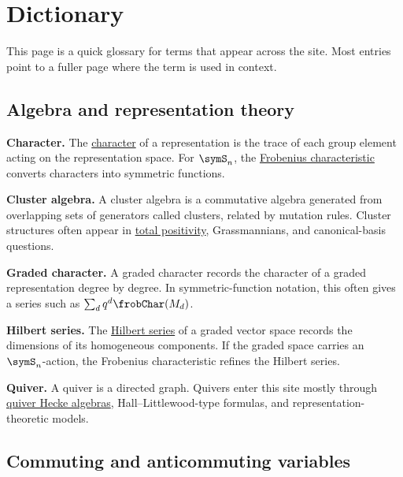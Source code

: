 

\section[wordList]{Dictionary}

This page is a quick glossary for terms that appear across the site.  Most
entries point to a fuller page where the term is used in context.


\subsection[dictionaryAlgebraRepresentation]{Algebra and representation theory}

\textbf{Character.}
The \hyperref[representationCharacterDefinition]{character} of a
representation is the trace of each group element acting on the representation
space.  For $\symS_n$, the
\hyperref[frobeniusCharacteristic]{Frobenius characteristic} converts
characters into symmetric functions.

\textbf{Cluster algebra.}
A cluster algebra is a commutative algebra generated from overlapping sets of
generators called clusters, related by mutation rules.  Cluster structures
often appear in \hyperref[totalPositivity]{total positivity}, Grassmannians,
and canonical-basis questions.

\textbf{Graded character.}
A graded character records the character of a graded representation degree by
degree.  In symmetric-function notation, this often gives a series such as
\(\sum_d q^d\frobChar(M_d)\).

\textbf{Hilbert series.}
The \hyperref[hilbertSeries]{Hilbert series} of a graded vector space records
the dimensions of its homogeneous components.  If the graded space carries an
$\symS_n$-action, the Frobenius characteristic refines the Hilbert series.

\textbf{Quiver.}
A quiver is a directed graph.  Quivers enter this site mostly through
\hyperref[algebras]{quiver Hecke algebras}, Hall--Littlewood-type formulas,
and representation-theoretic models.


\subsection[dictionaryCommutingVariables]{Commuting and anticommuting variables}

